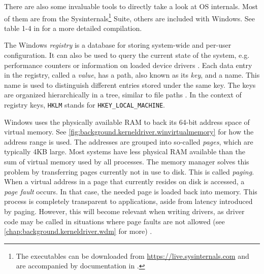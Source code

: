 There are also some invaluable tools to directly take a look at OS internals. Most of them are from the Sysinternals\footnote{\label{fn:background.kerneldriver.sysinternals} The executables can be downloaded from \url{https://live.sysinternals.com} and are accompanied by documentation in \cite{Russinovich2016}.} Suite, others are included with Windows. See table 1-4 in \cite{Yosifovich2017} for a more detailed compilation.

The Windows \emph{registry} is a database for storing system-wide and per-user configuration. It can also be used to query the current state of the system, e.g. performance counters or information on loaded device drivers \cite{Yosifovich2017}. Each data entry in the registry, called a \emph{value}, has a path, also known as its \emph{key}, and a name. This name is used to distinguish different entries stored under the same key. The keys are organized hierarchically in a tree, similar to file paths \cite{Win32}. In the context of registry keys, \texttt{HKLM} stands for \texttt{HKEY\_LOCAL\_MACHINE}.

Windows uses the physically available RAM to back its 64-bit address space of virtual memory. See \autoref{fig:background.kerneldriver.winvirtualmemory} for how the address range is used. The addresses are grouped into so-called \emph{pages}, which are typically 4KB large. Most systems have less physical RAM available than the sum of virtual memory used by all processes. The memory manager solves this problem by transferring pages currently not in use to disk. This is called \emph{paging}. When a virtual address in a page that currently resides on disk is accessed, a \emph{page fault} occurs. In that case, the needed page is loaded back into memory. This process is completely transparent to applications, aside from latency introduced by paging. However, this will become relevant when writing drivers, as driver code may be called in situations where page faults are not allowed (see \autoref{chap:background.kerneldriver.wdm} for more) \cite{Yosifovich2017}.

